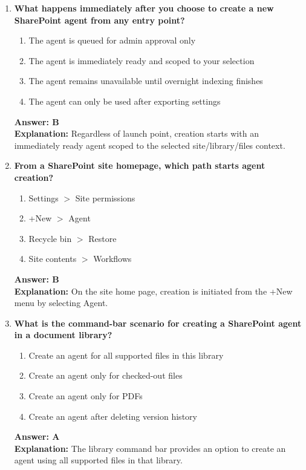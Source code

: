 \documentclass[10pt]{article}
\begin{document}
\begin{enumerate}[leftmargin=*]
\item \textbf{What happens immediately after you choose to create a new SharePoint agent from any entry point?}
\begin{enumerate}[label=\Alph*.]
  \item The agent is queued for admin approval only
  \item The agent is immediately ready and scoped to your selection
  \item The agent remains unavailable until overnight indexing finishes
  \item The agent can only be used after exporting settings
\end{enumerate}
\textbf{Answer: B}\\
\textbf{Explanation:} Regardless of launch point, creation starts with an immediately ready agent scoped to the selected site/library/files context.

\item \textbf{From a SharePoint site homepage, which path starts agent creation?}
\begin{enumerate}[label=\Alph*.]
  \item Settings $>$ Site permissions
  \item +New $>$ Agent
  \item Recycle bin $>$ Restore
  \item Site contents $>$ Workflows
\end{enumerate}
\textbf{Answer: B}\\
\textbf{Explanation:} On the site home page, creation is initiated from the +New menu by selecting Agent.

\item \textbf{What is the command-bar scenario for creating a SharePoint agent in a document library?}
\begin{enumerate}[label=\Alph*.]
  \item Create an agent for all supported files in this library
  \item Create an agent only for checked-out files
  \item Create an agent only for PDFs
  \item Create an agent after deleting version history
\end{enumerate}
\textbf{Answer: A}\\
\textbf{Explanation:} The library command bar provides an option to create an agent using all supported files in that library.


\end{enumerate}
\end{document}
